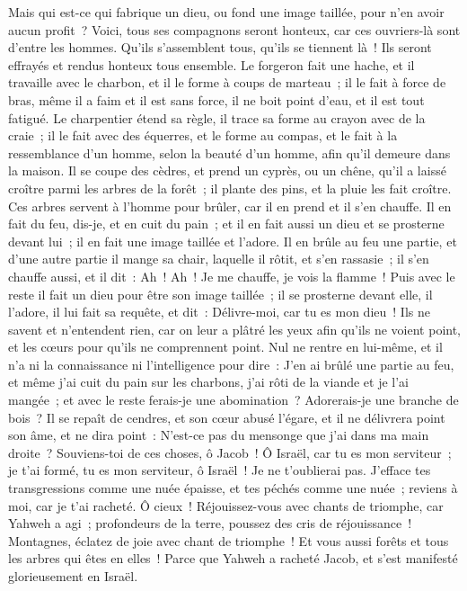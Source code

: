 \begin{multicols}{2}
Mais qui est-ce qui fabrique un dieu, ou fond une image taillée, pour n'en avoir aucun profit~?
Voici, tous ses compagnons seront honteux, car ces ouvriers-là sont d'entre les hommes. Qu'ils s'assemblent tous, qu'ils se tiennent là~! Ils seront effrayés et rendus honteux tous ensemble.
Le forgeron fait une hache, et il travaille avec le charbon, et il le forme à coups de marteau~; il le fait à force de bras, même il a faim et il est sans force, il ne boit point d'eau, et il est tout fatigué.
Le charpentier étend sa règle, il trace sa forme au crayon avec de la craie~; il le fait avec des équerres, et le forme au compas, et le fait à la ressemblance d'un homme, selon la beauté d'un homme, afin qu'il demeure dans la maison.
Il se coupe des cèdres, et prend un cyprès, ou un chêne, qu'il a laissé croître parmi les arbres de la forêt~; il plante des pins, et la pluie les fait croître.
Ces arbres servent à l'homme pour brûler, car il en prend et il s'en chauffe. Il en fait du feu, dis-je, et en cuit du pain~; et il en fait aussi un dieu et se prosterne devant lui~; il en fait une image taillée et l'adore.
Il en brûle au feu une partie, et d'une autre partie il mange sa chair, laquelle il rôtit, et s'en rassasie~; il s'en chauffe aussi, et il dit~: Ah~! Ah~! Je me chauffe, je vois la flamme~!
Puis avec le reste il fait un dieu pour être son image taillée~; il se prosterne devant elle, il l'adore, il lui fait sa requête, et dit~: Délivre-moi, car tu es mon dieu~!
Ils ne savent et n'entendent rien, car on leur a plâtré les yeux afin qu'ils ne voient point, et les cœurs pour qu'ils ne comprennent point.
Nul ne rentre en lui-même, et il n'a ni la connaissance ni l'intelligence pour dire~: J'en ai brûlé une partie au feu, et même j'ai cuit du pain sur les charbons, j'ai rôti de la viande et je l'ai mangée~; et avec le reste ferais-je une abomination~? Adorerais-je une branche de bois~?
Il se repaît de cendres, et son cœur abusé l'égare, et il ne délivrera point son âme, et ne dira point~: N'est-ce pas du mensonge que j'ai dans ma main droite~?
Souviens-toi de ces choses, ô Jacob~! Ô Israël, car tu es mon serviteur~; je t'ai formé, tu es mon serviteur, ô Israël~! Je ne t'oublierai pas.
J'efface tes transgressions comme une nuée épaisse, et tes péchés comme une nuée~; reviens à moi, car je t'ai racheté.
Ô cieux~! Réjouissez-vous avec chants de triomphe, car Yahweh a agi~; profondeurs de la terre, poussez des cris de réjouissance~! Montagnes, éclatez de joie avec chant de triomphe~! Et vous aussi forêts et tous les arbres qui êtes en elles~! Parce que Yahweh a racheté Jacob, et s'est manifesté glorieusement en Israël.

\end{multicols}
